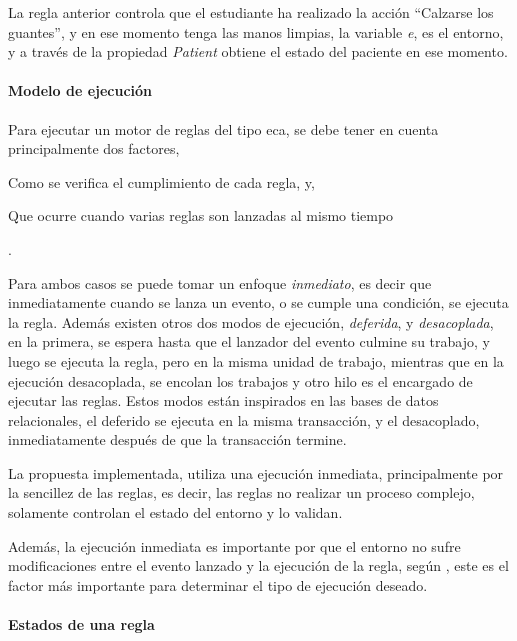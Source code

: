 La regla anterior controla que el estudiante ha realizado la acción ``Calzarse
los guantes'', y en ese momento tenga las manos limpias, la variable \emph{e},
es el entorno, y a través de la propiedad \emph{Patient} obtiene el estado del
paciente en ese momento.

\paragraph{Modelo de ejecución}

Para ejecutar un motor de reglas del tipo \gls{eca}, se debe tener en cuenta
principalmente dos factores, 
\begin{enumerate*}[label=\itshape\alph*\upshape)]
\item  Como se verifica el cumplimiento de cada regla, y, 
\item  Que ocurre cuando varias reglas son lanzadas al mismo tiempo
\end{enumerate*}.

Para ambos casos se puede tomar un enfoque \emph{inmediato}, es decir que
inmediatamente cuando se lanza un evento, o se cumple una condición, se ejecuta
la regla. Además existen otros dos modos de ejecución, \emph{deferida}, y
\emph{desacoplada}, en la primera, se espera hasta que el lanzador del evento
culmine su trabajo, y luego se ejecuta la regla, pero en la misma unidad de
trabajo, mientras que en la ejecución desacoplada, se encolan los trabajos y
otro hilo es el encargado de ejecutar las reglas. Estos modos están inspirados
en las bases de datos relacionales, el deferido se ejecuta en la misma
transacción, y el desacoplado, inmediatamente después de que la transacción
termine\cite{bailey2004event}.

La propuesta implementada, utiliza una ejecución inmediata, principalmente por
la sencillez de las reglas, es decir, las reglas no realizar un proceso complejo,
solamente controlan el estado del entorno y lo validan.

Además, la ejecución inmediata es importante por que el entorno no sufre
modificaciones entre el evento lanzado y la ejecución de la regla, según
\cite{bailey2004event}, este es el factor más importante para determinar el tipo
de ejecución deseado.



\paragraph{Estados de una regla}

